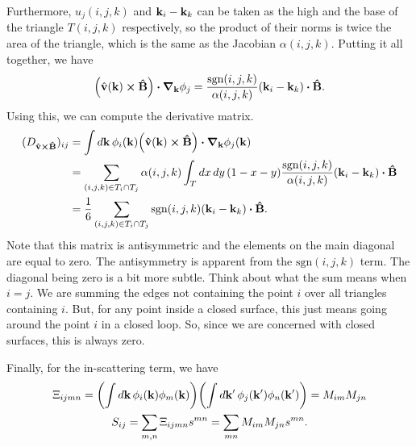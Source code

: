 \documentclass[12pt]{article}
\begin{document}
Furthermore, $u_j(i,j,k)$ and $\vb{k}_i - \vb{k}_k$ can be taken as the high and the base of
the triangle $T(i,j,k)$ respectively, so the product of their norms is twice the area of the
triangle, which is the same as the Jacobian $\alpha(i,j,k)$. Putting it all together, we have
\begin{equation}
    \qty(\hat{\vb{v}}(\vb{k})\cross\vu{B})\vdot\grad_{\vb{k}}\phi_j
    = \frac{\text{sgn}(i,j,k)}{\alpha(i,j,k)}(\vb{k}_i-\vb{k}_k)\vdot\vu{B}.
\end{equation}
Using this, we can compute the derivative matrix.
\begin{align}
    (D_{\vu{v}\cross\vu{B}})_{ij} &= \int\dd{\vb{k}}\phi_i(\vb{k})
    \qty(\vu{v}(\vb{k})\cross\vu{B})\vdot\grad_{\vb{k}}\phi_j(\vb{k}) \\
    &= \sum_{(i,j,k) \in T_i \cap T_j}\alpha(i,j,k) \int_T\dd{x}\dd{y}(1-x-y)
    \frac{\text{sgn}(i,j,k)}{\alpha(i,j,k)}(\vb{k}_i - \vb{k}_k)\vdot\vu{B} \notag \\
    &= \frac{1}{6} \sum_{(i,j,k) \in T_i \cap T_j}\text{sgn}(i,j,k)(\vb{k}_i-\vb{k}_k)\vdot\vu{B}.
    \notag
\end{align}
Note that this matrix is antisymmetric and the elements on the main diagonal are equal to zero.
The antisymmetry is apparent from the $\text{sgn}(i,j,k)$ term. The diagonal being zero is a bit
more subtle. Think about what the sum means when $i=j$. We are summing the edges not containing
the point $i$ over all triangles containing $i$. But, for any point inside a closed surface, this
just means going around the point $i$ in a closed loop. So, since we are concerned with closed
surfaces, this is always zero.

Finally, for the in-scattering term, we have
\begin{gather}
\Xi_{ijmn} = \qty(\int\dd{\vb{k}}\phi_i(\vb{k})\phi_m(\vb{k}))
    \qty(\int\dd{\vb{k'}}\phi_j(\vb{k'})\phi_n(\vb{k'})) = M_{im} M_{jn} \\
S_{ij} = \sum_{m,n}\Xi_{ijmn}s^{mn} = \sum_{mn}M_{im}M_{jn}s^{mn}.
\end{gather}
\end{document}
